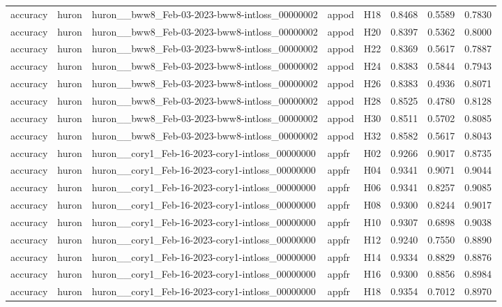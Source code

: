 \begin{table}[tbp]
\begin{tabular}{lllllrrr}
accuracy & huron & huron\_\_bww8\_Feb-03-2023-bww8-intloss\_00000002 & appod & H18 & 0.8468 & 0.5589 & 0.7830 \\
accuracy & huron & huron\_\_bww8\_Feb-03-2023-bww8-intloss\_00000002 & appod & H20 & 0.8397 & 0.5362 & 0.8000 \\
accuracy & huron & huron\_\_bww8\_Feb-03-2023-bww8-intloss\_00000002 & appod & H22 & 0.8369 & 0.5617 & 0.7887 \\
accuracy & huron & huron\_\_bww8\_Feb-03-2023-bww8-intloss\_00000002 & appod & H24 & 0.8383 & 0.5844 & 0.7943 \\
accuracy & huron & huron\_\_bww8\_Feb-03-2023-bww8-intloss\_00000002 & appod & H26 & 0.8383 & 0.4936 & 0.8071 \\
accuracy & huron & huron\_\_bww8\_Feb-03-2023-bww8-intloss\_00000002 & appod & H28 & 0.8525 & 0.4780 & 0.8128 \\
accuracy & huron & huron\_\_bww8\_Feb-03-2023-bww8-intloss\_00000002 & appod & H30 & 0.8511 & 0.5702 & 0.8085 \\
accuracy & huron & huron\_\_bww8\_Feb-03-2023-bww8-intloss\_00000002 & appod & H32 & 0.8582 & 0.5617 & 0.8043 \\
accuracy & huron & huron\_\_cory1\_Feb-16-2023-cory1-intloss\_00000000 & appfr & H02 & 0.9266 & 0.9017 & 0.8735 \\
accuracy & huron & huron\_\_cory1\_Feb-16-2023-cory1-intloss\_00000000 & appfr & H04 & 0.9341 & 0.9071 & 0.9044 \\
accuracy & huron & huron\_\_cory1\_Feb-16-2023-cory1-intloss\_00000000 & appfr & H06 & 0.9341 & 0.8257 & 0.9085 \\
accuracy & huron & huron\_\_cory1\_Feb-16-2023-cory1-intloss\_00000000 & appfr & H08 & 0.9300 & 0.8244 & 0.9017 \\
accuracy & huron & huron\_\_cory1\_Feb-16-2023-cory1-intloss\_00000000 & appfr & H10 & 0.9307 & 0.6898 & 0.9038 \\
accuracy & huron & huron\_\_cory1\_Feb-16-2023-cory1-intloss\_00000000 & appfr & H12 & 0.9240 & 0.7550 & 0.8890 \\
accuracy & huron & huron\_\_cory1\_Feb-16-2023-cory1-intloss\_00000000 & appfr & H14 & 0.9334 & 0.8829 & 0.8876 \\
accuracy & huron & huron\_\_cory1\_Feb-16-2023-cory1-intloss\_00000000 & appfr & H16 & 0.9300 & 0.8856 & 0.8984 \\
accuracy & huron & huron\_\_cory1\_Feb-16-2023-cory1-intloss\_00000000 & appfr & H18 & 0.9354 & 0.7012 & 0.8970 \\

\end{tabular}
\end{table}
